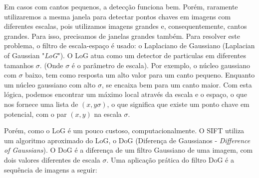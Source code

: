 Em casos com cantos pequenos, a detecção funciona bem. Porém, raramente utilizaremos a mesma janela para detectar pontos chaves em imagens com diferentes escalas, pois utilizamos imagens grandes e, consequentemente, cantos grandes. Para isso, precisamos de janelas grandes também. Para resolver este problema, o filtro de escala-espaço é usado: o Laplaciano de Gaussiano (Laplacian of Gaussian "{\it LoG}"). O LoG atua como um detector de particulas em diferentes tamanhos $\sigma$. (Onde $\sigma$ é o parâmetro de escala). Por exemplo, o núcleo gaussiano com $\sigma$ baixo, tem como resposta um alto valor para um canto pequeno. Enquanto um núcleo gaussiano com alto $\sigma$, se encaixa bem para um canto maior. Com esta lógica, podemos encontrar um máximo local através da escala e o espaço, o que nos fornece uma lista de $(x,y \sigma)$, o que significa que existe um ponto chave em potencial, com o par $(x,y)$ na escala $\sigma$.


Porém, como o LoG é um pouco custoso, computacionalmente. O SIFT utiliza um algoritmo aproximado do LoG, o DoG (Diferença de Gaussianos - {\it Difference of Gaussians}). O DoG é a diferença de um filtro Gaussiano de uma imagem, com dois valores diferentes de escala $\sigma$. 
Uma aplicação prática do filtro DoG é a sequência de imagens a seguir:

